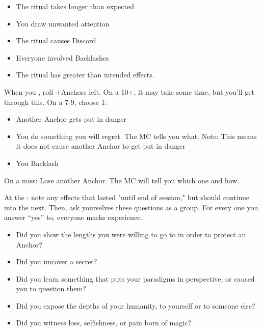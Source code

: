 \begin{multicols}{3}
\begin{move}
    \begin{itemize}
      \setlength\itemsep{0em}
    \item The ritual takes longer than expected
    \item You draw unwanted attention
    \item The ritual causes Discord
    \item Everyone involved Backlashes
    \item The ritual has greater than intended effects.
    \end{itemize}

  \end{move}

  \SEPARATOR

  \begin{move}
    When you , roll +Anchors left. On a 10+, it may take some time, but you’ll get through this. On a 7-9, choose 1:

    \begin{itemize}
      \setlength\itemsep{0em}
    \item Another Anchor gets put in danger
    \item You do something you will regret. The MC tells you what. Note: This means it does not cause another Anchor to get put in danger
    \item You Backlash 
    \end{itemize}
On a miss: Lose another Anchor. The MC will tell you which one and how.

  \end{move}

  \columnbreak

  \begin{move}
    At the : note any effects that lasted "until end of session," but should continue into the next. Then, ask yourselves these questions as a group. For every one you answer “yes” to, everyone marks experience.

    \begin{itemize}
      \setlength\itemsep{0em}
    \item Did you show the lengths you were willing to go to in order to protect an Anchor?  
    \item Did you uncover a secret?  
    \item Did you learn something that puts your paradigms in perspective, or caused you to question them?  
    \item Did you expose the depths of your humanity, to yourself or to someone else?  
    \item Did you witness loss, selfishness, or pain born of magic?
    \end{itemize}


\end{move}
\end{multicols}
